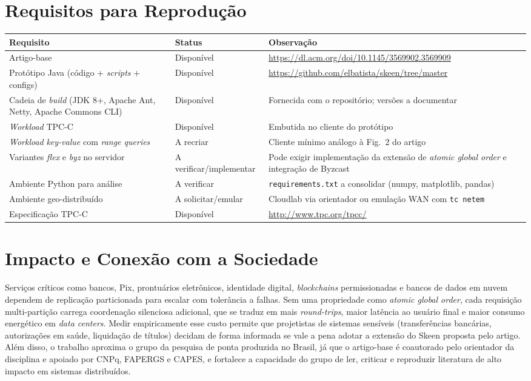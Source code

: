\documentclass[10pt,a4paper]{article}
\begin{document}
\section{Requisitos para Reprodução}
\begin{center}\small
\begin{tabular}{@{}p{4.8cm}p{2.4cm}p{8.8cm}@{}}
\toprule
\textbf{Requisito} & \textbf{Status} & \textbf{Observação} \\
\midrule
Artigo-base & Disponível & \url{https://dl.acm.org/doi/10.1145/3569902.3569909} \\
Protótipo Java (código + \textit{scripts} + configs) & Disponível & \url{https://github.com/elbatista/skeen/tree/master} \\
Cadeia de \textit{build} (JDK 8+, Apache Ant, Netty, Apache Commons CLI) & Disponível & Fornecida com o repositório; versões a documentar \\
\textit{Workload} TPC-C & Disponível & Embutida no cliente do protótipo \\
\textit{Workload} \textit{key-value} com \textit{range queries} & A recriar & Cliente mínimo análogo à Fig.~2 do artigo \\
Variantes \textit{flex} e \textit{byz} no servidor & A verificar/implementar & Pode exigir implementação da extensão de \textit{atomic global order} e integração de Byzcast \\
Ambiente Python para análise & A verificar & \texttt{requirements.txt} a consolidar (numpy, matplotlib, pandas) \\
Ambiente geo-distribuído & A solicitar/emular & Cloudlab via orientador ou emulação WAN com \texttt{tc netem} \\
Especificação TPC-C & Disponível & \url{http://www.tpc.org/tpcc/} \\
\bottomrule
\end{tabular}
\end{center}

\section{Impacto e Conexão com a Sociedade}
Serviços críticos como bancos, Pix, prontuários eletrônicos, identidade digital, \textit{blockchains} permissionadas e bancos de dados em nuvem dependem de replicação particionada para escalar com tolerância a falhas. Sem uma propriedade como \textit{atomic global order}, cada requisição multi-partição carrega coordenação silenciosa adicional, que se traduz em mais \textit{round-trips}, maior latência ao usuário final e maior consumo energético em \textit{data centers}. Medir empiricamente esse custo permite que projetistas de sistemas sensíveis (transferências bancárias, autorizações em saúde, liquidação de títulos) decidam de forma informada se vale a pena adotar a extensão do Skeen proposta pelo artigo. Além disso, o trabalho aproxima o grupo da pesquisa de ponta produzida no Brasil, já que o artigo-base é coautorado pelo orientador da disciplina e apoiado por CNPq, FAPERGS e CAPES, e fortalece a capacidade do grupo de ler, criticar e reproduzir literatura de alto impacto em sistemas distribuídos.
\end{document}
